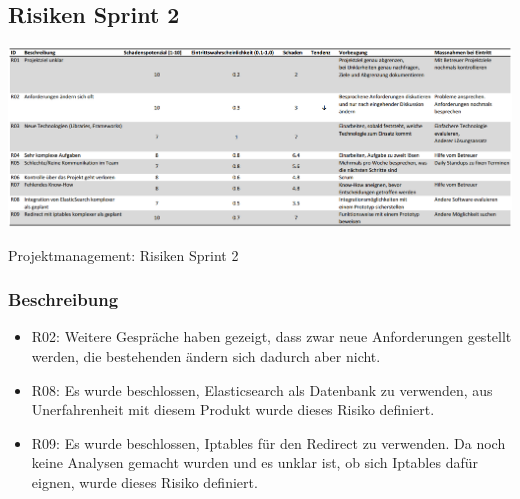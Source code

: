 \begin{landscape} 
    \subsection{Risiken Sprint 2}
  	\begin{table}[H]		
  	       \centering	
		\includegraphics[width=\linewidth,keepaspectratio]{risiken/Risiken-Sprint-2.png}
		\caption{Projektmanagement: Risiken Sprint 2}
	\end{table}
	
	\subsubsection{Beschreibung}
	\begin{itemize}
		\item R02: Weitere Gespräche haben gezeigt, dass zwar neue Anforderungen gestellt werden, die bestehenden ändern sich dadurch aber nicht.
		\item R08: Es wurde beschlossen, Elasticsearch als Datenbank zu verwenden, aus Unerfahrenheit mit diesem Produkt wurde dieses Risiko definiert.
		\item R09: Es wurde beschlossen, Iptables für den Redirect zu verwenden. Da noch keine Analysen gemacht wurden und es unklar ist, ob sich Iptables dafür eignen, wurde dieses Risiko definiert.
	\end{itemize}
\end{landscape}

